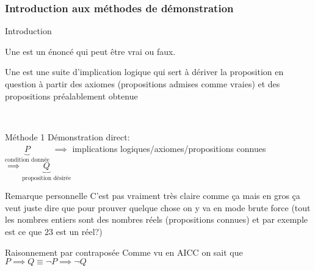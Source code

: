 \subsubsection{Introduction aux méthodes de démonstration}
\begin{parag}{Introduction}
    \begin{definition}
        Une  est un énoncé qui peut être vrai ou faux.
    \end{definition}
    \begin{definition}
        Une  est une suite d'implication logique qui sert à dériver la proposition en question à partir des axiomes (propositions admises comme vraies) et des propositions préalablement obtenue
    \end{definition}
\end{parag}
\
\begin{parag}{Méthode 1}
    Démonstration direct:\\ $\underbrace{P}_{\text{condition donnée}}$ $\implies$ implications logiques/axiomes/propositions connues $\implies \underbrace{Q}_{\text{proposition désirée}}$
    \begin{subparag}{Remarque personnelle}
        C'est pas vraiment très claire comme ça mais en gros ça veut juste dire que pour prouver quelque chose on y va en mode brute force (tout les nombres entiers sont des nombres réels (propositions connues) et par exemple est ce que $23$ est un réel?) 
    \end{subparag}
\end{parag}
\begin{parag}{Raisonnement par contraposée}
    Comme vu en AICC on sait que $P \implies Q \equiv \neg P \implies \neg Q$
\end{parag}
